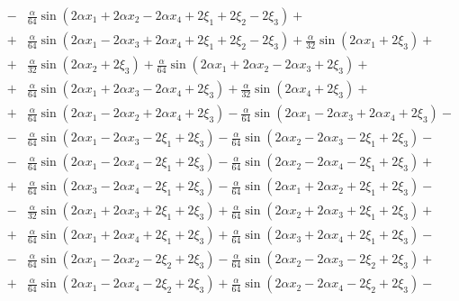 \documentclass[11pt]{jfm}
\numberwithin{equation}{section}
\begin{document}
\begin{eqnarray}
&\!-\!& \frac{\alpha}{64} \sin(2\alpha x_1 \!+\! 2\alpha x_2 \!-\! 2\alpha x_4 \!+\! 2\xi_1 \!+\! 2\xi_2 \!-\! 2\xi_3)\!+\!  \nonumber\\
&\!+\!&\frac{\alpha}{64} \sin(2\alpha x_1 \!-\! 2\alpha x_3 \!+\! 2\alpha x_4 \!+\! 2\xi_1 \!+\! 2\xi_2 \!-\! 2\xi_3)\!+\! \frac{\alpha}{32} \sin(2\alpha x_1 \!+\! 2\xi_3)\!+\! \nonumber\\
&\!+\!&\frac {\alpha}{32} \sin(2\alpha x_2 \!+\! 2\xi_3)\!+\! \frac{\alpha}{64} \sin(2\alpha x_1 \!+\! 2\alpha x_2 \!-\! 2\alpha x_3 \!+\! 2\xi_3)\!+\! \nonumber\\
&\!+\!& \frac{\alpha}{64} \sin(2\alpha x_1 \!+\! 2\alpha x_3 \!-\! 2\alpha x_4 \!+\! 2\xi_3)\!+\!\frac{\alpha}{32} \sin(2\alpha x_4 \!+\! 2\xi_3)\!+\! \nonumber\\
&\!+\!&\frac{\alpha}{64} \sin(2\alpha x_1 \!-\! 2\alpha x_2 \!+\! 2\alpha x_4 \!+\! 2\xi_3)\!-\!\frac{\alpha}{64} \sin(2\alpha x_1 \!-\! 2\alpha x_3 \!+\! 2\alpha x_4 \!+\! 2\xi_3)\!-\! \nonumber\\
&\!-\!&\frac{\alpha}{64} \sin(2\alpha x_1 \!-\! 2\alpha x_3 \!-\! 2\xi_1 \!+\! 2\xi_3) \!-\!\frac{\alpha}{64} \sin(2\alpha x_2 \!-\! 2\alpha x_3 \!-\! 2\xi_1 \!+\! 2\xi_3) \!-\! \nonumber\\
&\!-\!&\frac{\alpha}{64} \sin(2\alpha x_1 \!-\! 2\alpha x_4 \!-\! 2\xi_1 \!+\! 2\xi_3)\!-\! \frac{\alpha}{64} \sin(2\alpha x_2 \!-\! 2\alpha x_4 \!-\! 2\xi_1 \!+\! 2\xi_3)\!+\! \nonumber\\
&\!+\!&\frac{\alpha}{64} \sin(2\alpha x_3 \!-\! 2\alpha x_4 \!-\! 2\xi_1 \!+\! 2\xi_3)\!-\! \frac{\alpha}{64} \sin(2\alpha x_1 \!+\! 2\alpha x_2 \!+\! 2\xi_1 \!+\! 2\xi_3)\!-\!  \nonumber\\
&\!-\!&\frac{\alpha}{32} \sin(2\alpha x_1 \!+\! 2\alpha x_3 \!+\! 2\xi_1 \!+\! 2\xi_3)\!+\! \frac{\alpha}{64} \sin(2\alpha x_2 \!+\! 2\alpha x_3 \!+\! 2\xi_1 \!+\! 2\xi_3)\!+\! \nonumber\\
&\!+\!&\frac{\alpha}{64} \sin(2\alpha x_1 \!+\! 2\alpha x_4 \!+\! 2\xi_1 \!+\! 2\xi_3)\!+\! \frac{\alpha}{64} \sin(2\alpha x_3 \!+\! 2\alpha x_4 \!+\! 2\xi_1 \!+\! 2\xi_3)\!-\!\nonumber\\
&\!-\!&\frac{\alpha}{64} \sin(2\alpha x_1 \!-\! 2\alpha x_2 \!-\! 2\xi_2 \!+\! 2\xi_3)\!-\! \frac{\alpha}{64} \sin(2\alpha x_2 \!-\! 2\alpha x_3 \!-\! 2\xi_2 \!+\! 2\xi_3)\!+\! \nonumber\\
&\!+\!& \frac{\alpha}{64} \sin(2\alpha x_1 \!-\! 2\alpha x_4 \!-\! 2\xi_2 \!+\! 2\xi_3)\!+\! \frac{\alpha}{64} \sin(2\alpha x_2 \!-\! 2\alpha x_4 \!-\! 2\xi_2 \!+\! 2\xi_3)\!-\!\nonumber\\

\end{eqnarray}
\end{document}
